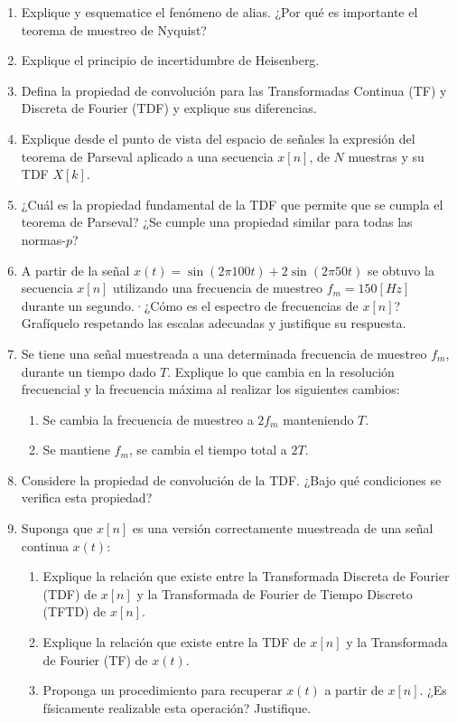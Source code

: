 \documentclass[a4paper,10pt,spanish]{article}
\begin{document}
\begin{enumerate}
\item Explique y esquematice el fenómeno de alias. ¿Por qué es importante el teorema de muestreo de Nyquist?

\item Explique el principio de incertidumbre de Heisenberg.

\item Defina la propiedad de convolución para las Transformadas Continua (TF) y Discreta de Fourier (TDF) y explique sus diferencias.

\item Explique desde el punto de vista del espacio de señales la expresión del teorema  de Parseval aplicado a una secuencia $x[n]$, de $N$ muestras y su TDF $X[k]$.

\item ¿Cuál es la propiedad fundamental de la TDF que permite que se cumpla el teorema de Parseval? ¿Se cumple una propiedad similar para todas las normas-$p$?

\item A partir de la señal $x(t)=\sin(2\pi 100t)+2\sin(2\pi 50t)$ se obtuvo la secuencia $x[n]$ utilizando una frecuencia de muestreo $f_{m}=150[Hz]$ durante un segundo.·¿Cómo es el espectro de frecuencias de $x[n]$? Grafíquelo respetando las escalas adecuadas y justifique su respuesta.

\item Se tiene una señal muestreada a una determinada frecuencia de muestreo $f_{m}$, durante un tiempo dado $T$. Explique lo que cambia en la resolución frecuencial y la frecuencia máxima al realizar los siguientes cambios:
	\begin{enumerate}
	\item Se cambia la frecuencia de muestreo a $2f_{m}$ manteniendo $T$.
	\item Se mantiene $f_{m}$, se cambia el tiempo total a $2T$.
	\end{enumerate}

\item Considere la propiedad de convolución de la TDF. ¿Bajo qué condiciones se verifica esta propiedad?

\item Suponga que $x[n]$ es una versión correctamente muestreada de una señal continua $x(t)$:
	\begin{enumerate}
	\item Explique la relación que existe entre la Transformada Discreta de Fourier 		(TDF) de $x[n]$ y la Transformada de Fourier de Tiempo Discreto (TFTD) de $x[n]$.
	
	\item Explique la relación que existe entre la TDF de $x[n]$ y la Transformada de 		Fourier (TF) de $x(t)$.
	
	\item Proponga un procedimiento para recuperar $x(t)$ a partir de $x[n]$. ¿Es 			físicamente realizable esta operación? Justifique.
	\end{enumerate}

\end{enumerate}
\end{document}
